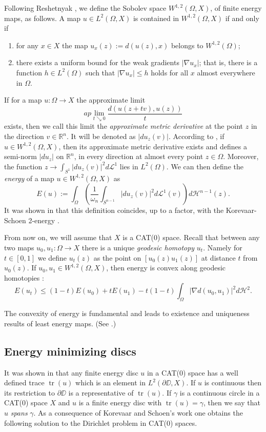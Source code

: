 \documentclass[a4paper,10pt]{amsart}
\begin{document}
Following Reshetnyak \cite{R}, we define the Sobolev space $W^{1,2}(\Omega,X)$, of finite energy maps, as follows. 
A map $u\in L^2(\Omega,X)$ is contained in $W^{1,2}(\Omega,X)$ if and only if

\begin{enumerate}
 \item for any $x\in X$ the map $u_x(z):=d(u(z),x)$ belongs to $W^{1,2}(\Omega)$;
 \item there exists a uniform bound for the weak gradients $|\nabla u_x|$; 
 that is, there is a function $h\in L^2(\Omega)$ 
 such that $|\nabla u_x|\leq h$ holds for all $x$ almost everywhere in $\Omega$. 
\end{enumerate}

If for a map $u:\Omega\to X$ the  approximate limit
$$
ap\lim_{t\searrow 0}\frac{d(u(z+tv),u(z))}{t}
$$
exists, then we call this limit the {\em approximate metric derivative} at the point $z$ in the direction $v\in\mathbb{R}^n$. It will be denoted
as $|du_z(v)|$. According to
\cite[Prop.4.3]{LW}, if $u\in W^{1,2}(\Omega,X)$, then its approximate metric derivative exists and defines a semi-norm $|du_z|$ on $\mathbb{R}^n$, 
in every direction at almost every point $z\in\Omega$. Moreover, the function $z\to\int_{S^1}|du_z(v)|^2 d\mathcal{L}^1$ lies in $L^2(\Omega)$.
We can then define the {\em energy} of a map $u\in W^{1,2}(\Omega,X)$ as
$$
E(u):=\int_\Omega\left(\frac{1}{\omega_n}\int_{S^{n-1}}|du_z(v)|^2 d\mathcal{L}^1(v)\right)d\mathcal{H}^{n-1}(z).
$$
It was shown in \cite{LW} that this definition coincides, up to a factor, with the Korevaar-Schoen 2-energy \cite{KS}.

From now on, we will assume that $X$ is a CAT(0) space. Recall that between any two maps $u_0,u_1:\Omega\to X$ there is 
a unique {\em geodesic homotopy} $u_t$. Namely for $t\in[0,1]$ we define $u_t(z)$ as the point on $[u_0(z)u_1(z)]$ at distance $t$
from $u_0(z)$. If $u_0, u_1\in W^{1,2}(\Omega,X)$, then energy is convex along geodesic homotopies \cite[(2.2vi)]{KS}:
$$
E(u_t)\leq (1-t)E(u_0)+tE(u_1)-t(1-t)\int_\Omega|\nabla d(u_0,u_1)|^2d\mathcal{H}^2.
$$

The convexity of energy is fundamental and leads to existence and uniqueness results of least energy maps. (See \cite{KS}.)

\subsection{Energy minimizing discs}

It was shown in \cite{KS} that any finite energy disc $u$ in a CAT(0) space has a well defined trace $\operatorname{tr}(u)$ which is an
element in $L^2(\partial\DD,X)$. If $u$ is continuous then its restriction to $\partial\DD$ is a representative of $\operatorname{tr}(u)$.
If $\gamma$ is a continuous circle in a CAT(0) space $X$ and $u$ is a finite energy disc with $\operatorname{tr}(u)=\gamma$, then we say that 
$u$ {\em spans} $\gamma$.
As a consequence of Korevaar and Schoen's work one obtains the following solution to the Dirichlet problem in CAT(0) spaces.
\end{document}
